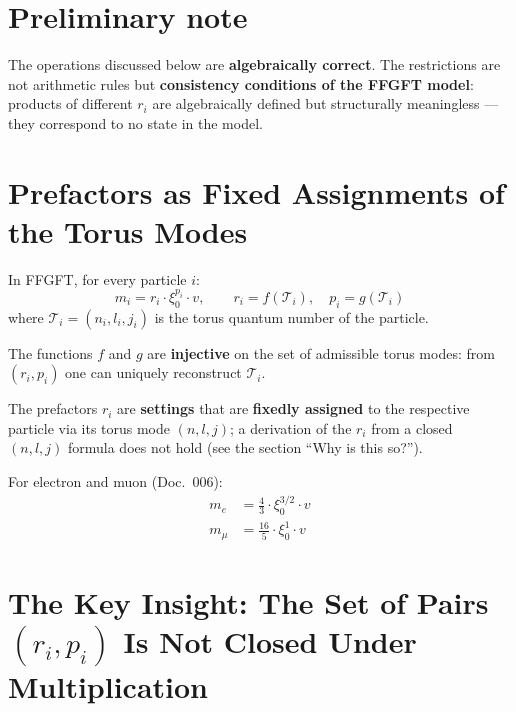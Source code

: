 
\section*{Preliminary note}

The operations discussed below are \textbf{algebraically correct}.
The restrictions are not arithmetic rules but
\textbf{consistency conditions of the FFGFT model}:
products of different $r_i$ are algebraically defined
but structurally meaningless --- they correspond to no state in the model.

\section{Prefactors as Fixed Assignments of the Torus Modes}

In FFGFT, for every particle $i$:
\begin{equation}
  m_i = r_i \cdot \xi_0^{p_i} \cdot v,
  \qquad r_i = f(\mathcal{T}_i), \quad p_i = g(\mathcal{T}_i)
\end{equation}
where $\mathcal{T}_i = (n_i, l_i, j_i)$ is the torus quantum number of the particle.

The functions $f$ and $g$ are \textbf{injective} on the set of admissible
torus modes: from $(r_i, p_i)$ one can uniquely reconstruct $\mathcal{T}_i$.

The prefactors $r_i$ are \textbf{settings} that are \textbf{fixedly
assigned} to the respective particle via its torus mode $(n,l,j)$;
a derivation of the $r_i$ from a closed $(n,l,j)$ formula does not hold
(see the section \enquote{Why is this so?}).

For electron and muon (Doc.~006):
\begin{align}
  m_e &= \frac{4}{3} \cdot \xi_0^{3/2} \cdot v \label{eq:me}\\
  m_\mu &= \frac{16}{5} \cdot \xi_0^{1} \cdot v \label{eq:mmu}
\end{align}

\section{The Key Insight: The Set of Pairs \texorpdfstring{\texorpdfstring{$(r_i,p_i)$}{(ri,pi)}}{(ri,pi)} Is Not Closed Under Multiplication}

